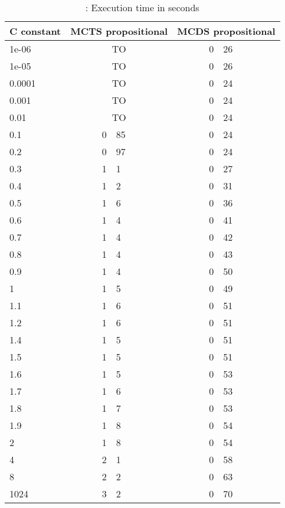 \begin{table}
    \label{}
    \caption{: Execution time in seconds}
    \begin{tabular}{l*2{r@{.}l}} 
        \toprule
        C constant & \multicolumn{2}{c}{MCTS propositional}&\multicolumn{2}{c}{MCDS propositional}\\
        \midrule
        1e-06 & \multicolumn{2}{c}{TO} & 0&26\\
        1e-05 & \multicolumn{2}{c}{TO} & 0&26\\
        0.0001 & \multicolumn{2}{c}{TO} & 0&24\\
        0.001 & \multicolumn{2}{c}{TO} & 0&24\\
        0.01 & \multicolumn{2}{c}{TO} & 0&24\\
        0.1 & 0&85 & 0&24\\
        0.2 & 0&97 & 0&24\\
        0.3 & 1&1 & 0&27\\
        0.4 & 1&2 & 0&31\\
        0.5 & 1&6 & 0&36\\
        0.6 & 1&4 & 0&41\\
        0.7 & 1&4 & 0&42\\
        0.8 & 1&4 & 0&43\\
        0.9 & 1&4 & 0&50\\
        1 & 1&5 & 0&49\\
        1.1 & 1&6 & 0&51\\
        1.2 & 1&6 & 0&51\\
        1.4 & 1&5 & 0&51\\
        1.5 & 1&5 & 0&51\\
        1.6 & 1&5 & 0&53\\
        1.7 & 1&6 & 0&53\\
        1.8 & 1&7 & 0&53\\
        1.9 & 1&8 & 0&54\\
        2 & 1&8 & 0&54\\
        4 & 2&1 & 0&58\\
        8 & 2&2 & 0&63\\
        1024 & 3&2 & 0&70\\
        \bottomrule
    \end{tabular}
\end{table}